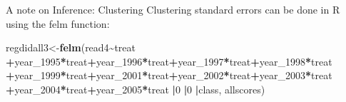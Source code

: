 \documentclass[
  ignorenonframetext,
]{beamer}
\newenvironment{Shaded}{\begin{snugshade}}{\end{snugshade}}
\newcommand{\DecValTok}[1]{\textcolor[rgb]{0.00,0.00,0.81}{#1}}
\newcommand{\KeywordTok}[1]{\textcolor[rgb]{0.13,0.29,0.53}{\textbf{#1}}}
\newcommand{\NormalTok}[1]{#1}
\newcommand{\OperatorTok}[1]{\textcolor[rgb]{0.81,0.36,0.00}{\textbf{#1}}}
\begin{document}
\begin{frame}[fragile]{A note on Inference: Clustering}
\protect\hypertarget{a-note-on-inference-clustering-1}{}
Clustering standard errors can be done in R using the felm function:
\tiny

\begin{Shaded}
\begin{Highlighting}[]
\NormalTok{regdidall3\textless{}{-}}\KeywordTok{felm}\NormalTok{(read4}\OperatorTok{\textasciitilde{}}\NormalTok{treat}
                 \OperatorTok{+}\NormalTok{year\_}\DecValTok{1995}\OperatorTok{*}\NormalTok{treat}\OperatorTok{+}\NormalTok{year\_}\DecValTok{1996}\OperatorTok{*}\NormalTok{treat}\OperatorTok{+}\NormalTok{year\_}\DecValTok{1997}\OperatorTok{*}\NormalTok{treat}\OperatorTok{+}\NormalTok{year\_}\DecValTok{1998}\OperatorTok{*}\NormalTok{treat}
                 \OperatorTok{+}\NormalTok{year\_}\DecValTok{1999}\OperatorTok{*}\NormalTok{treat}\OperatorTok{+}\NormalTok{year\_}\DecValTok{2001}\OperatorTok{*}\NormalTok{treat}\OperatorTok{+}\NormalTok{year\_}\DecValTok{2002}\OperatorTok{*}\NormalTok{treat}\OperatorTok{+}\NormalTok{year\_}\DecValTok{2003}\OperatorTok{*}\NormalTok{treat}
                 \OperatorTok{+}\NormalTok{year\_}\DecValTok{2004}\OperatorTok{*}\NormalTok{treat}\OperatorTok{+}\NormalTok{year\_}\DecValTok{2005}\OperatorTok{*}\NormalTok{treat}
                 \OperatorTok{|}\DecValTok{0}
                 \OperatorTok{|}\DecValTok{0}
                 \OperatorTok{|}\NormalTok{class,}
\NormalTok{                 allscores)}
\end{Highlighting}
\end{Shaded}
\end{frame}
\end{document}

